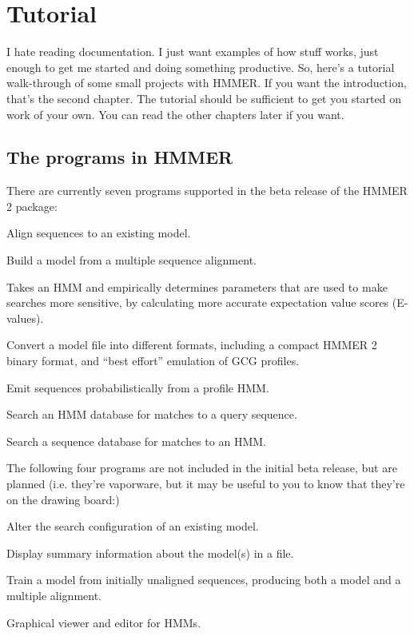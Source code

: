 \chapter{Tutorial}

I hate reading documentation. I just want examples of how stuff works,
just enough to get me started and doing something productive. So,
here's a tutorial walk-through of some small projects with HMMER. If
you want the introduction, that's the second chapter. The tutorial
should be sufficient to get you started on work of your own. You can
read the other chapters later if you want.

\section {The programs in HMMER}

There are currently seven programs supported in the beta release of the
HMMER 2 package:

\begin{wideitem}
\item[\emprog{hmmalign}] Align sequences to an existing model.
\item[\emprog{hmmbuild}] Build a model from a multiple sequence alignment.
\item[\emprog{hmmcalibrate}] Takes an HMM and empirically determines
parameters that are used to make searches more sensitive, by
calculating more accurate expectation value scores (E-values).
\item[\emprog{hmmconvert}] Convert a model file into different formats,
including a compact HMMER 2 binary format, and ``best effort''
emulation of GCG profiles.
\item[\emprog{hmmemit}] Emit sequences probabilistically from a profile HMM.
\item[\emprog{hmmpfam}] Search an HMM database for matches to a query sequence.
\item[\emprog{hmmsearch}] Search a sequence database for matches to an HMM.
\end{wideitem}

The following four programs are not included in the initial beta
release, but are planned (i.e. they're vaporware, but it may be useful
to you to know that they're on the drawing board:)

\begin{wideitem}
\item[\emprog{hmmconfig}] Alter the search configuration of an existing model.
\item[\emprog{hmminfo}] Display summary information about the model(s) in a file.
\item[\emprog{hmmtrain}] Train a model from initially unaligned sequences,
producing both a model and a multiple alignment.
\item[\emprog{hmmview}] Graphical viewer and editor for HMMs.
\end{wideitem}


